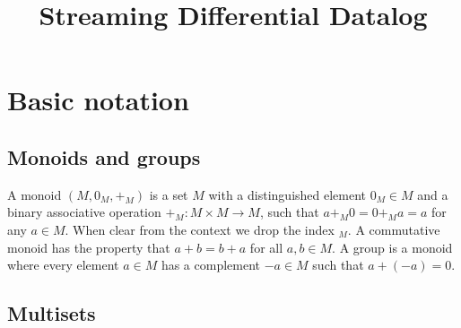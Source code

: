 \documentclass[10pt]{article}
\title{Streaming Differential Datalog}
\newcommand{\code}[1]{\texttt{#1}}
\newcommand{\Z}{\mathbb{Z}}  %
\newcommand{\N}{\mathbb{N}}  %
\newcommand{\B}{\mathbb{B}}  %
\newcommand{\multiset}[1]{\mathit{multiset}_{#1}}
\newcommand{\set}[1]{\mathit{set}_{#1}}
\begin{document}
\maketitle

\section{Basic notation}

\begin{comment}
\subsection{Types}

$\N$ is the set of natural numbers, while $\Z$ is the set of integers.

Our language will deal with a set of base types $B$ that includes
$\N$, $\Z$, \code{string}, $\B$ (Booleans), $\mathbf{unit}$.

Derived types include: tuples, vectors (lists), functions.

$$T = B \;|\; T \times T \;|\; T^* \;|\; T \rightarrow T$$


A typing context is a map that assigns types to variable names.
$\Gamma = x_1 : T_1, x_2 : T_2, \ldots, x_m : T_m$, where $T_i$ is the
type of variable $x_i$.
\end{comment}

\subsection{Monoids and groups}

A monoid $(M, 0_M, +_M)$ is a set $M$ with a distinguished element
$0_M \in M$ and a binary associative operation $+_M : M \times M
\rightarrow M$, such that $a +_M 0 = 0 +_M a = a$ for any $a \in M$.
When clear from the context we drop the index $_M$.  A commutative
monoid has the property that $a + b = b + a$ for all $a, b \in M$.  A
group is a monoid where every element $a \in M$ has a complement $-a
\in M$ such that $a + (-a) = 0$.

\subsection{Multisets}
\end{document}
